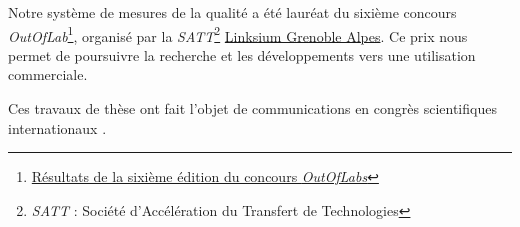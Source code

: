 \bigskip
Notre système de mesures de la qualité a été lauréat du sixième concours \textit{OutOfLab}\footnote{\href{http://outoflabs.linksium.fr/resultats/}{Résultats de la sixième édition du concours \textit{OutOfLabs}}}, organisé par la \textit{SATT}\footnote{\textit{SATT} : Société d'Accélération du Transfert de Technologies} \href{https://www.linksium.fr/}{Linksium Grenoble Alpes}.
Ce prix nous permet de poursuivre la recherche et les développements vers une utilisation commerciale.

\bigskip
Ces travaux de thèse ont fait l’objet de communications en congrès scientifiques internationaux \cite{nagorny_towards_2017, nagorny_injection_2017, nagorny_quality_2017, nagorny_generative_2018, nagorny_polarimetric_2019}.
